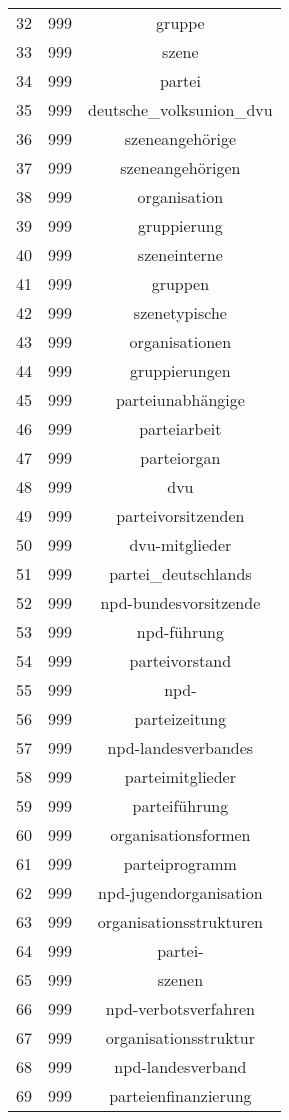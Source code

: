 \begin{table}[!htbp]
\begin{tabular}{@{\extracolsep{5pt}} ccc}
32 & 999 & gruppe \\ 
33 & 999 & szene \\ 
34 & 999 & partei \\ 
35 & 999 & deutsche\_volksunion\_dvu \\ 
36 & 999 & szeneangehörige \\ 
37 & 999 & szeneangehörigen \\ 
38 & 999 & organisation \\ 
39 & 999 & gruppierung \\ 
40 & 999 & szeneinterne \\ 
41 & 999 & gruppen \\ 
42 & 999 & szenetypische \\ 
43 & 999 & organisationen \\ 
44 & 999 & gruppierungen \\ 
45 & 999 & parteiunabhängige \\ 
46 & 999 & parteiarbeit \\ 
47 & 999 & parteiorgan \\ 
48 & 999 & dvu \\ 
49 & 999 & parteivorsitzenden \\ 
50 & 999 & dvu-mitglieder \\ 
51 & 999 & partei\_deutschlands \\ 
52 & 999 & npd-bundesvorsitzende \\ 
53 & 999 & npd-führung \\ 
54 & 999 & parteivorstand \\ 
55 & 999 & npd- \\ 
56 & 999 & parteizeitung \\ 
57 & 999 & npd-landesverbandes \\ 
58 & 999 & parteimitglieder \\ 
59 & 999 & parteiführung \\ 
60 & 999 & organisationsformen \\ 
61 & 999 & parteiprogramm \\ 
62 & 999 & npd-jugendorganisation \\ 
63 & 999 & organisationsstrukturen \\ 
64 & 999 & partei- \\ 
65 & 999 & szenen \\ 
66 & 999 & npd-verbotsverfahren \\ 
67 & 999 & organisationsstruktur \\ 
68 & 999 & npd-landesverband \\ 
69 & 999 & parteienfinanzierung \\ 

\end{tabular}
\end{table}
